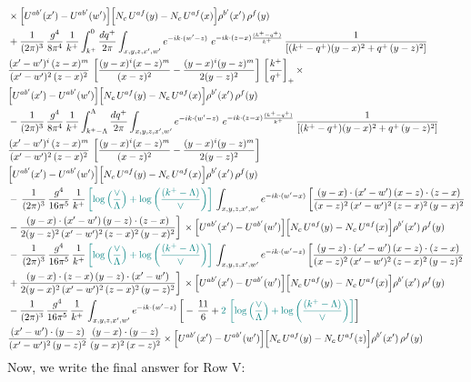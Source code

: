 \documentclass[9pt]{article}
\numberwithin{equation}{section}
\begin{document}
\begin{align}
&\times\Big[U^{ab'}(x')-U^{ab'}(w')\Big]\Big[N_{c}\,U^{af}(y)-N_{c}\,U^{af}(x)\Big]\rho^{b'}(x')\,\rho^{f}(y)\notag \\ & + \frac{1}{(2\pi)^{3}}\,\frac{g^{4}}{8\pi^{4}}\,\frac{1}{k^{+}}\int_{k^{+}}^{0}\frac{dq^{+}}{2\pi}\int_{x,y,z,x',w'}e^{-ik\cdot(w'-z)}\ e^{-ik\cdot(z-x)\frac{(k^{+}-q^{+})}{k^{+}}}\,\frac{1}{\left[(k^{+}-q^{+})(y-x)^{2}+q^{+}\,(y-z)^{2}\right]}\notag \\ & \frac{(x'-w')^{i}\,(z-x)^{m}}{(x'-w')^{2}\,(z-x)^{2}}\,\left[\frac{(y-x)^{i}(x-z)^{m}}{(x-z)^{2}}-\frac{(y-x)^{i}(y-z)^{m}}{2(y-z)^{2}}\right]\,\left[\frac{k^{+}}{q^{+}}\right]_{+}\times\notag \\ & \Big[U^{ab'}(x')-U^{ab'}(w')\Big]\Big[N_{c}\,U^{af}(y)-N_{c}\,U^{af}(x)\Big]\rho^{b'}(x')\,\rho^{f}(y)\notag \\ & - \frac{1}{(2\pi)^{3}}\,\frac{g^{4}}{8\pi^{4}}\,\frac{1}{k^{+}}\int_{k^{+}-\Lambda}^{\Lambda}\frac{dq^{+}}{2\pi}\int_{x,y,z,x',w'}e^{-ik\cdot(w'-z)}\ e^{-ik\cdot(z-x)\frac{(k^{+}-q^{+})}{k^{+}}}\,\frac{1}{\left[(k^{+}-q^{+})(y-x)^{2}+q^{+}\,(y-z)^{2}\right]}\notag \\ & \frac{(x'-w')^{i}\,(z-x)^{m}}{(x'-w')^{2}\,(z-x)^{2}}\,\left[\frac{(y-x)^{i}(x-z)^{m}}{(x-z)^{2}}-\frac{(y-x)^{i}(y-z)^{m}}{2(y-z)^{2}}\right]\notag \\ & \Big[U^{ab'}(x')-U^{ab'}(w')\Big]\Big[N_{c}\,U^{af}(y)-N_{c}\,U^{af}(x)\Big]\rho^{b'}(x')\,\rho^{f}(y)\notag \\ & -\, \frac{1}{(2\pi)^{3}}\,\frac{g^{4}}{16\pi^{5}}\,\frac{1}{k^{+}}\,{\color{teal}\left[\log{\left(\frac{\vee}{\Lambda}\right)} + \log{\left(\frac{(k^{+}-\Lambda)}{\vee}\right)}\right]}\,\int_{x,y,z,x',w'}e^{-ik\cdot(w'-x)}\, \bigg[\frac{(y-x)\cdot (x'-w')\,(x-z)\cdot (z-x)}{(x-z)^{2}\,(x'-w')^{2}\,(z-x)^{2}\,(y-x)^{2}}\notag \\ & -\frac{(y-x)\cdot (x'-w')\,(y-z)\cdot (z-x)}{2(y-z)^{2}\,(x'-w')^{2}\,(z-x)^{2}\,(y-x)^{2}}\bigg]\,\times \Big[U^{ab'}(x')-U^{ab'}(w')\Big]\Big[N_{c}\,U^{af}(y)-N_{c}\,U^{af}(x)\Big]\rho^{b'}(x')\,\rho^{f}(y)\notag \\ & -\, \frac{1}{(2\pi)^{3}}\,\frac{g^{4}}{16\pi^{5}}\,\frac{1}{k^{+}}\,{\color{teal}\left[\log{\left(\frac{\vee}{\Lambda}\right)} + \log{\left(\frac{(k^{+}-\Lambda)}{\vee}\right)}\right]}\,\int_{x,y,z,x',w'}e^{-ik\cdot(w'-z)}\,\bigg[\frac{(y-z)\cdot (x'-w')\,(x-z)\cdot (z-x)}{(x-z)^{2}\,(x'-w')^{2}\,(z-x)^{2}\,(y-z)^{2}}\notag \\ & +\frac{(y-x)\cdot (z-x)\,(y-z)\cdot (x'-w')}{2(y-x)^{2}\,(x'-w')^{2}\,(z-x)^{2}\,(y-z)^{2}}\bigg]\,\times \Big[U^{ab'}(x')-U^{ab'}(w')\Big]\Big[N_{c}\,U^{af}(y)-N_{c}\,U^{af}(x)\Big]\rho^{b'}(x')\,\rho^{f}(y)\notag \\ & - \frac{1}{(2\pi)^{3}}\,\frac{g^{4}}{16\pi^{5}}\,\frac{1}{k^{+}}\,\int_{x,y,z,x',w'}e^{-ik\cdot(w'-z)}\,\bigg[-\,\frac{11}{6}+{\color{teal}2\,\left[\log{\left(\frac{\vee}{\Lambda}\right)} + \log{\left(\frac{(k^{+}-\Lambda)}{\vee}\right)}\right]}\bigg]\notag \\ & \frac{(x'-w')\cdot(y-z)}{(x'-w')^{2}\,(y-z)^{2}}\,\frac{(y-x)\cdot(y-z)}{(y-x)^{2}\,(x-z)^{2}}\times\Big[U^{ab'}(x')-U^{ab'}(w')\Big]\Big[N_{c}\,U^{af}(y)-N_{c}\,U^{af}(z)\Big]\rho^{b'}(x')\,\rho^{f}(y)
\end{align}
Now, we write the final answer for Row V:
\end{document}
